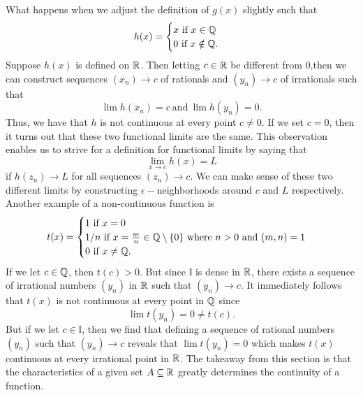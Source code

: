 What happens when we adjust the definition of \( g(x) \) slightly such that 
\[  h(x) = 
\begin{cases}
    x ~ \text{if} ~ x \in \mathbb{Q}  \\ 
    0 ~ \text{if} ~ x \notin \mathbb{Q}.
\end{cases} \]
Suppose \( h(x) \) is defined on \( \mathbb{R}  \). Then letting \( c \in \mathbb{R}  \) be different from \( 0 \),then we can construct sequences \( (x_n) \to c  \) of rationals and \( (y_n) \to c  \) of irrationals such that 
\[  \lim h(x_n) = c ~ \text{and} ~ \lim h(y_n) = 0. \]
Thus, we have that \( h \) is not continuous at every point \( c \neq 0 \). If we set \( c = 0  \), then it turns out that these two functional limits are the same. This observation enables us to strive for a definition for functional limits by saying that 
\[  \lim_{ x \to c } h(x) = L  \] if 
\( h(z_n) \to L  \) for all sequences \( (z_n) \to c  \). We can make sense of these two different limits by constructing \( \epsilon - \)neighborhoods around \( c \) and \( L \) respectively.
Another example of a non-continuous function is 
\[  t(x) = 
\begin{cases}
    1 ~ \text{if} ~ x = 0  \\
    1/n ~ \text{if} ~ x = \frac{ m }{ n } \in \mathbb{Q} \setminus \{ 0 \} \text{ where } n > 0 \text{ and }  (m,n) = 1   \\
    0 ~\text{if}~ x \neq \mathbb{Q}.
\end{cases} \]
If we let \( c \in \mathbb{Q}  \), then \( t(c) > 0  \). But since \( \mathbb{I} \) is dense in \( \mathbb{R}  \), there exists a sequence of irrational numbers \( (y_n) \) in \( \mathbb{R}  \) such that \( (y_n) \to c  \). It immediately follows that \( t(x) \) is not continuous at every point in \( \mathbb{Q}  \) since 
\[ \lim t(y_n) = 0 \neq t(c). \]
But if we let \( c \in \mathbb{I} \), then we find that defining a sequence of rational numbers \( (y_n)  \) such that \( (y_n) \to c  \) reveals that \( \lim t(y_n) = 0  \) which makes \( t(x) \)continuous at every irrational point in \( \mathbb{R}  \). The takeaway from this section is that the characteristics of a given set \( A \subseteq \mathbb{R}  \) greatly determines the continuity of a function. 

